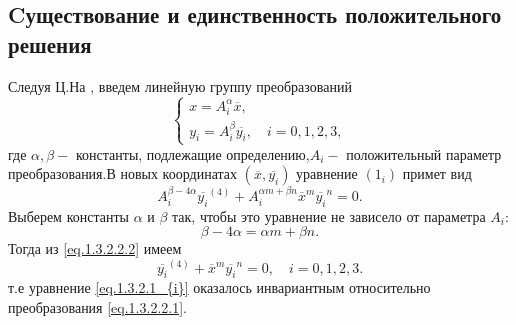 {%
%
%

\subsection{Cуществование и единственность положительного решения}

Следуя Ц.На \cite{CeNa}, введем линейную группу преобразований
\begin{equation}\label{eq.1.3.2.2.1}
\begin{cases}
x=A_i^\alpha \overline {x},\\
y_i=A_i^\beta \overline{y_i}, \quad i=0,1,2,3,
\end{cases}
\end{equation}
где $ \alpha,\beta- $ константы, подлежащие определению,$ A_i- $  положительный
параметр преобразо\-вания.В новых координатах $ (\overline {x},\overline{y_i}) $
уравнение $ (1_i) $ примет вид
\begin{equation}\label{eq.1.3.2.2.2}
A_i^{\beta-4 \alpha} {\overline{y_i}}^{(4)}+
A_i^{\alpha m+\beta n}{\overline {x}}^m {\overline{y_i}}^n=0.
\end{equation}
Выберем константы $ \alpha $ и $ \beta $  так, чтобы это уравнение не зависело
от параметра $ A_i: $
\begin{equation}\label{eq.1.3.2.2.3}
\beta-4 \alpha=\alpha m+\beta n.
\end{equation}
Тогда из \eqref{eq.1.3.2.2.2} имеем
\begin{equation}\label{eq.1.3.2.2.4}
{\overline{y_i}}^{(4)}+{\overline {x}}^m {\overline{y_i}}^n=0, \quad i=0,1,2,3.
\end{equation}
т.е уравнение \eqref{eq.1.3.2.1_{i}} оказалось инвариантным относительно преобразования \eqref{eq.1.3.2.2.1}.

}
